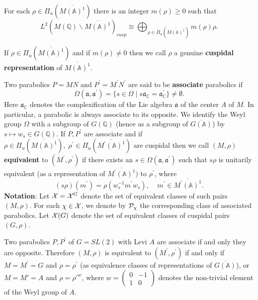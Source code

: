 \begin{proposition}
For each $\rho \in \Pi _u(\overline{M({\mathbb{A}})^1})$
there is an integer $m(\rho )\geq 0$ such that 
\[
L^2(M({{\mathbb{Q}}})\backslash \overline{M({\mathbb{A}})^1})_{cusp}\cong
\bigoplus_{\rho \in \Pi _u(\overline{M({\mathbb{A}})^1})}m(\rho )\rho .
\]
\end{proposition}

If
$\rho \in \Pi _u(\overline{M({\mathbb{A}})^1})$ and if $m(\rho )\neq 0$
then we call $\rho $ a genuine {\bf cuspidal
representation} of $\overline{M({\mathbb{A}})^1}$.

Two parabolics $P=MN$ and $P^{\prime }=M^{\prime }N^{\prime }$ are said to
be {\bf associate} parabolics if 
\[
\Omega ({\mathfrak{a}},{\mathfrak{a}}^{\prime })
=\{s\in \Omega \;|\;s{\mathfrak{a}}_{{\mathbb C}}
={\mathfrak{a}}_{{\mathbb C}}^{\prime }\}\neq \emptyset . 
\]
Here ${\mathfrak{a}}_{\mathbb{C}}$ denotes the
complexification of the Lie algebra
${\mathfrak{a}}$ of the center $A$ of $M$. In particular, a parabolic is
always associate to its opposite.
We identify the Weyl group $\Omega$ with a
subgroup of $G({\mathbb{Q}})$ (hence as a subgroup of
$\overline{G({\mathbb{A}})}$) by $s\longmapsto w_s\in G({\mathbb{Q}})$.
If $P,P^{\prime }$ are associate and if 
$\rho \in \Pi _u(\overline{M({\mathbb{A}})^1}),
\;\rho ^{\prime }\in \Pi _u(\overline{M^{\prime }({\mathbb{A}})^1})$
are cuspidal then we call $(M,\rho )$ {\bf equivalent} to
$(M^{\prime },\rho ^{\prime })$ if there exists an
$s\in \Omega ({\mathfrak{a}}, {\mathfrak{a}}^{\prime })$ such that
$s\rho $ is unitarily equivalent (as a
representation of $\overline{M^{\prime }({\mathbb{A}})^1})$
to $\rho ^{\prime }$, where 
\[
(s\rho )(m^{\prime })=\rho (w_s^{-1}m^{\prime }w_s),
\;\;\;\;m^{\prime }\in \overline{M^{\prime }({{\mathbb{A}}})^1}. 
\]
{\bf Notation}:
Let ${\cal{X}}={\cal{X}}^G$ denote the set of equivalent classes of such
pairs $(M,\rho )$.
For each $\chi \in {\cal X}$, we denote by
${\cal P}_\chi $ the corresponding class of associated parabolics.
Let ${\cal{X}}(G)$ denote the set of equivalent classes of
cuspidal pairs $(G,\rho )$.

\begin{example}
Two parabolics $P,P^{\prime }$ of $G=SL(2)$ with Levi $A$
are associate if and only they are opposite.
Therefore $(M,\rho )$ is equivalent to $(M^{\prime },\rho ^{\prime })$
if and only if $M=M^{\prime }=G$ and $\rho =\rho ^{\prime }$
(as equivalence classes of representations of
$\overline{G({\mathbb{A}})}$),
or $M=M'=A$ and $\rho ={\rho'}^w$, where 
$w=
\left(
\begin{array}{cc}
0 &-1\\
1&0
\end{array}
\right)$
denotes the non-trivial element of the Weyl group of $A$.
\end{example}


